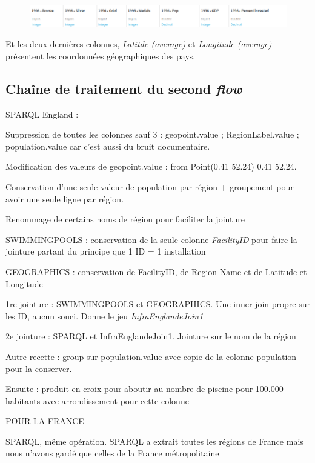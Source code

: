 \documentclass[hidelinks, 12pt]{article}
\begin{document}
\begin{center}
	\begin{figure}[H]
		\includegraphics[scale=0.4]{tableaufinal.png}
	\end{figure}
\end{center}


Et les deux dernières colonnes, \emph{Latitde (average)} et \emph{Longitude (average)} présentent les coordonnées géographiques des pays.


\subsection{Chaîne de traitement du second \emph{flow}}

SPARQL England :

Suppression de toutes les colonnes sauf 3 : geopoint.value ; RegionLabel.value ; population.value car c'est aussi du bruit documentaire.

Modification des valeurs de geopoint.value : from Point(0.41 52.24) 0.41 52.24.

Conservation d'une seule valeur de population par région + groupement pour avoir une seule ligne par région.

Renommage de certains noms de région pour faciliter la jointure


SWIMMINGPOOLS : conservation de la seule colonne \emph{FacilityID} pour faire la jointure partant du principe que 1 ID = 1 installation

GEOGRAPHICS : conservation de FacilityID, de Region Name et de Latitude et Longitude

1re jointure : SWIMMINGPOOLS et GEOGRAPHICS. Une inner join propre sur les ID, aucun souci. Donne le jeu \emph{InfraEnglandeJoin1}

2e jointure : SPARQL et InfraEnglandeJoin1. Jointure sur le nom de la région

Autre recette : group sur population.value avec copie de la colonne population pour la conserver.

Ensuite : produit en croix pour aboutir au nombre de piscine pour 100.000 habitants avec arrondissement pour cette colonne





POUR LA FRANCE

SPARQL, même opération. SPARQL a extrait toutes les régions de France mais nous n'avons gardé que celles de la France métropolitaine 
\end{document}
